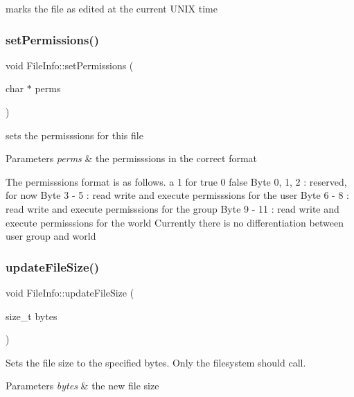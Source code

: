 marks the file as edited at the current U\+N\+IX time \mbox{\label{classFileInfo_ab2b69861ecef1b8e0f465906c8eaa7a7}} 
\subsubsection{\texorpdfstring{set\+Permissions()}{setPermissions()}}
{\footnotesize\ttfamily void File\+Info\+::set\+Permissions (\begin{DoxyParamCaption}\item[{char $\ast$}]{perms }\end{DoxyParamCaption})}



sets the permisssions for this file 


\begin{DoxyParams}{Parameters}
{\em perms} & the permisssions in the correct format\\
\hline
\end{DoxyParams}
The permisssions format is as follows. a 1 for true 0 false Byte 0, 1, 2 \+: reserved, for now Byte 3 -\/ 5 \+: read write and execute permisssions for the user Byte 6 -\/ 8 \+: read write and execute permisssions for the group Byte 9 -\/ 11 \+: read write and execute permisssions for the world Currently there is no differentiation between user group and world \mbox{\label{classFileInfo_ae0389f01dbb6b4d365d1d062a9f5b146}} 
\subsubsection{\texorpdfstring{update\+File\+Size()}{updateFileSize()}}
{\footnotesize\ttfamily void File\+Info\+::update\+File\+Size (\begin{DoxyParamCaption}\item[{size\+\_\+t}]{bytes }\end{DoxyParamCaption})}

Sets the file size to the specified bytes. Only the filesystem should call. 
\begin{DoxyParams}{Parameters}
{\em bytes} & the new file size \\
\hline
\end{DoxyParams}
\mbox{\label{classFileInfo_a15d8f9279f1d60e4db4618cb81e68414}} 
